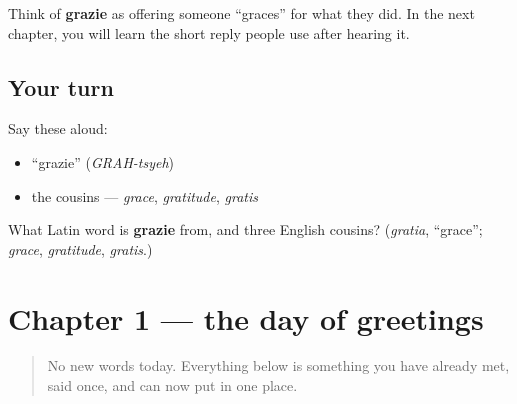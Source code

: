 \begin{culture}
Think of \textbf{grazie} as offering someone \textquotedblleft{}graces\textquotedblright{} for what they did. In the next chapter, you will learn the short reply people use after hearing it.
\end{culture}

\subsection*{Your turn}
Say these aloud:

\begin{itemize}
\raggedright
  \item \textquotedblleft{}grazie\textquotedblright{} (\emph{GRAH-tsyeh})
  \item the cousins — \emph{grace}, \emph{gratitude}, \emph{gratis}
\end{itemize}

\begin{tcolorbox}[breakable,colback=teal!4,colframe=teal!35!black,title={Before you move on}]
What Latin word is \textbf{grazie} from, and three English cousins? (\emph{gratia}, \textquotedblleft{}grace\textquotedblright{}; \emph{grace}, \emph{gratitude}, \emph{gratis}.)
\end{tcolorbox}
\section[Practice]{Chapter 1 — the day of greetings}

\label{lesson:IT-C01-practice}



\begin{quote}
No new words today. Everything below is something you have already met, said once, and can now put in one place.
\end{quote}

